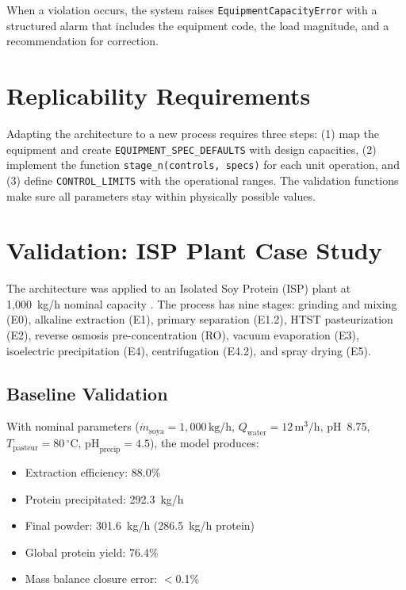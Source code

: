 \documentclass[10pt]{article}
\begin{document}
When a violation occurs, the system raises \texttt{Equipment}\allowbreak\texttt{CapacityError} with a structured alarm that includes the equipment code, the load magnitude, and a recommendation for correction.

\section{Replicability Requirements}

Adapting the architecture to a new process requires three steps: (1) map the equipment and create \texttt{EQUIPMENT\_SPEC\_}\allowbreak\texttt{DEFAULTS} with design capacities, (2) implement the function \texttt{stage\_n}\allowbreak\texttt{(controls,}\allowbreak\texttt{ specs)} for each unit operation, and (3) define \texttt{CONTROL\_}\allowbreak\texttt{LIMITS} with the operational ranges. The validation functions make sure all parameters stay within physically possible values.

\section{Validation: ISP Plant Case Study}

The architecture was applied to an Isolated Soy Protein (ISP) plant at 1,000~kg/h nominal capacity \cite{lusas1995soy,kinsella1979}. The process has nine stages: grinding and mixing (E0), alkaline extraction (E1), primary separation (E1.2), HTST pasteurization (E2), reverse osmosis pre-concentration (RO), vacuum evaporation (E3), isoelectric precipitation (E4), centrifugation (E4.2), and spray drying (E5).

\subsection{Baseline Validation}

With nominal parameters ($\dot{m}_{\text{soya}} = 1{,}000\,\text{kg/h}$, $Q_{\text{water}} = 12\,\text{m}^3/\text{h}$, pH~8.75, $T_{\text{pasteur}} = 80\,^\circ$C, $\text{pH}_{\text{precip}} = 4.5$), the model produces:

\begin{itemize}
    \item Extraction efficiency: 88.0\%
    \item Protein precipitated: 292.3~kg/h
    \item Final powder: 301.6~kg/h (286.5~kg/h protein)
    \item Global protein yield: 76.4\%
    \item Mass balance closure error: $<$0.1\%
\end{itemize}
\end{document}
